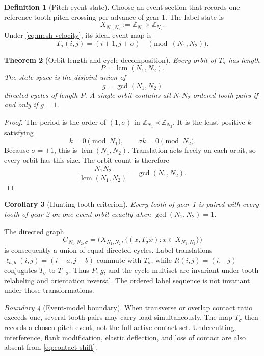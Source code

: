 \documentclass[11pt,a4paper]{article}
\theoremstyle{definition}
\newtheorem{definition}{Definition}[section]
\theoremstyle{plain}
\newtheorem{theorem}[definition]{Theorem}
\newtheorem{corollary}[definition]{Corollary}
\theoremstyle{remark}
\newtheorem{warning}[definition]{Boundary}
\newcommand{\Z}{\mathbb{Z}}
\begin{document}
\begin{definition}[Pitch-event state]
Choose an event section that records one reference tooth-pitch
crossing per advance of gear 1. The label state is
\[
X_{N_1,N_2}:=\Z_{N_1}\times\Z_{N_2}.
\]
Under \cref{eq:mesh-velocity}, its ideal event map is
\begin{equation}\label{eq:contact-shift}
T_\sigma(i,j)=(i+1,j+\sigma)
\quad\pmod{(N_1,N_2)}.
\end{equation}
\end{definition}

\begin{theorem}[Orbit length and cycle decomposition]
\label{thm:cycle-decomposition}
Every orbit of \(T_\sigma\) has length
\[
P=\operatorname{lcm}(N_1,N_2).
\]
The state space is the disjoint union of
\[
g=\gcd(N_1,N_2)
\]
directed cycles of length \(P\). A single orbit contains all
\(N_1N_2\) ordered tooth pairs if and only if \(g=1\).
\end{theorem}

\begin{proof}
The period is the order of \((1,\sigma)\) in
\(\Z_{N_1}\times\Z_{N_2}\). It is the least positive \(k\) satisfying
\[
k=0\pmod{N_1},\qquad \sigma k=0\pmod{N_2}.
\]
Because \(\sigma=\pm1\), this is
\(\operatorname{lcm}(N_1,N_2)\). Translation acts freely on each
orbit, so every orbit has this size. The orbit count is therefore
\[
\frac{N_1N_2}{\operatorname{lcm}(N_1,N_2)}
=\gcd(N_1,N_2).
\]
\end{proof}

\begin{corollary}[Hunting-tooth criterion]
Every tooth of gear 1 is paired with every tooth of gear 2 on one
event orbit exactly when \(\gcd(N_1,N_2)=1\).
\end{corollary}

The directed graph
\[
G_{N_1,N_2,\sigma}
=\bigl(X_{N_1,N_2},
\{(x,T_\sigma x):x\in X_{N_1,N_2}\}\bigr)
\]
is consequently a union of equal directed cycles. Label translations
\(\ell_{a,b}(i,j)=(i+a,j+b)\) commute with \(T_\sigma\), while
\(R(i,j)=(i,-j)\) conjugates \(T_\sigma\) to \(T_{-\sigma}\).
Thus \(P\), \(g\), and the cycle multiset are invariant under tooth
relabeling and orientation reversal. The ordered label sequence is
not invariant under those transformations.

\begin{warning}[Event-model boundary]
When transverse or overlap contact ratio exceeds one, several tooth
pairs may carry load simultaneously. The map \(T_\sigma\) then
records a chosen pitch event, not the full active contact set.
Undercutting, interference, flank modification, elastic deflection,
and loss of contact are also absent from \cref{eq:contact-shift}.
\end{warning}
\end{document}
